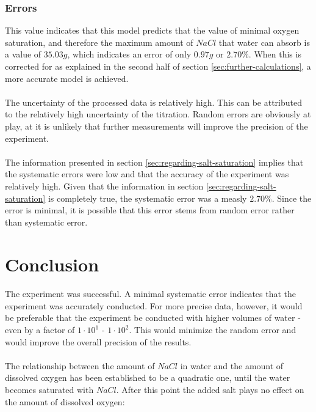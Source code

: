 \documentclass[a4paper]{article}
\begin{document}
\subsubsection{Errors}

This value indicates that this model predicts that the value of minimal oxygen
saturation, and therefore the maximum amount of $NaCl$ that water can absorb is
a value of $35.03\si{g}$, which indicates an error of only $0.97\si{g}$ or
$2.70\%$. When this is corrected for as explained in the second half of section
\ref{sec:further-calculations}, a more accurate model is achieved.

\paragraph*{}
The uncertainty of the processed data is relatively high. This can be
attributed to the relatively high uncertainty of the titration. Random errors
are obviously at play, at it is unlikely that further measurements will improve
the precision of the experiment.

\paragraph*{}
The information presented in section \ref{sec:regarding-salt-saturation}
implies that the systematic errors were low and that the accuracy of the
experiment was relatively high. Given that the information in section
\ref{sec:regarding-salt-saturation} is completely true, the systematic error
was a measly $2.70\%$. Since the error is minimal, it is possible that this
error stems from random error rather than systematic error.

\section{Conclusion}

\paragraph*{}
The experiment was successful. A minimal systematic error indicates that the
experiment was accurately conducted. For more precise data, however, it would
be preferable that the experiment be conducted with higher volumes of water -
even by a factor of $1 \cdot 10^1$ - $1 \cdot 10^2$. This would minimize the
random error and would improve the overall precision of the results.

\paragraph*{}
The relationship between the amount of $NaCl$ in water and the amount of
dissolved oxygen has been established to be a quadratic one, until the water
becomes saturated with $NaCl$. After this point the added salt plays no effect
on the amount of dissolved oxygen:
\end{document}
